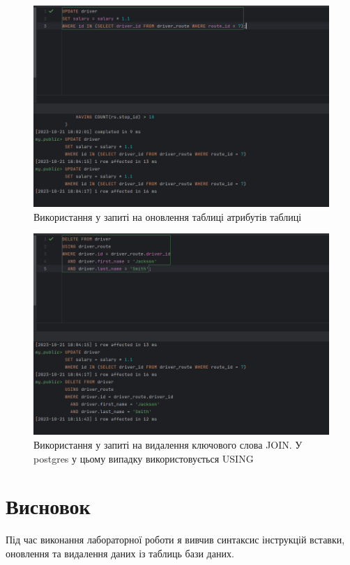 \documentclass[14pt]{extreport}
\begin{document}
\begin{normalsize}
	\begin{figure}[H]
		\centering
		\includegraphics[scale=0.5]{4}
		\caption{Використання у запиті на оновлення таблиці атрибутів таблиці}
	\end{figure}
	
	\begin{figure}[H]
		\centering
		\includegraphics[scale=0.5]{5}
		\caption{Використання у запиті на видалення ключового слова JOIN. У postgres у цьому випадку використовується USING}
	\end{figure}
	\section*{Висновок}
	Під час виконання лабораторної роботи я вивчив синтаксис інструкцій вставки, оновлення та видалення даних із	таблиць бази даних.
	 
\end{normalsize}
\end{document}
